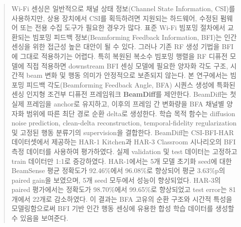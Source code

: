 \begin{abstract}
Wi-Fi 센싱은 일반적으로 채널 상태 정보(Channel State Information, CSI)를
사용하지만, 상용 장치에서 CSI를 획득하려면 지원되는 하드웨어, 수정된 펌웨어
또는 전용 수집 도구가 필요한 경우가 많다. 표준 Wi-Fi 빔포밍 절차에서
교환되는 빔포밍 피드백 정보(Beamforming Feedback Information, BFI)는 인간
센싱을 위한 접근성 높은 대안이 될 수 있다. 그러나 기존 RF 생성 기법을
BFI에 그대로 적용하기는 어렵다. 특히 복원된 복소수 빔포밍 행렬을 RF
디퓨전 모델에 직접 적용하면 downstream BFI 센싱 모델에 필요한 양자화 각도
구조, 시간적 beam 변화 및 행동 의미가 안정적으로 보존되지 않는다. 본
연구에서는 빔포밍 피드백 각도(Beamforming Feedback Angle, BFA) 시퀀스
생성에 특화된 센싱 인지형 조건부 디퓨전 프레임워크 \textbf{BeamDiff}를
제안한다. BeamDiff는 첫 실제 프레임을 anchor로 유지하고, 이후의 프레임 간
변화량을 BFA 채널별 양자화 범위에 따른 최단 경로 순환 delta로 생성한다.
학습 목적 함수는 diffusion noise prediction, clean-delta reconstruction,
temporal-fidelity regularization 및 고정된 행동 분류기의 supervision을
결합한다. BeamDiff는 CSI-BFI-HAR 데이터셋에서 제공하는 HAR-1 Kitchen과
HAR-3 Classroom 시나리오의 BFI 측정 데이터를 사용하여 평가하였다. 실제
validation 및 test 데이터는 고정하고 train 데이터만 1:1로 증강하였다.
HAR-1에서는 5개 모델 초기화 seed에 대한 BeamSense 평균
정확도가 92.46\%에서 96.08\%로 향상되어 평균 3.63\%p의 paired gain을
보였으며, 5개 seed 모두에서 성능이 향상되었다. HAR-3의 paired
평가에서는 정확도가 98.70\%에서 99.65\%로 향상되었고 test error는 81개에서
22개로 감소하였다. 이 결과는 BFA 고유의 순환 구조와 시간적 특성을
모델링함으로써 BFI 기반 인간 행동 센싱에 유용한 합성 학습 데이터를 생성할
수 있음을 보여준다.
\end{abstract}
